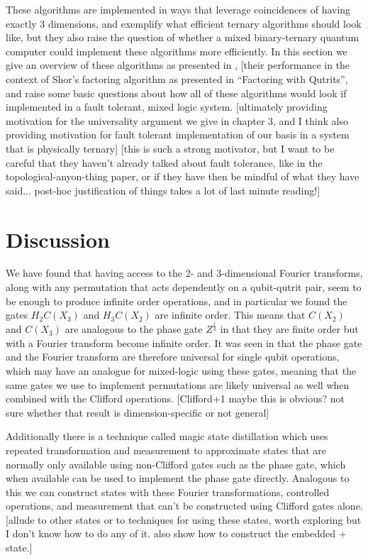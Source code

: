 \documentclass[]{article}
\begin{document}
These algorithms are implemented in ways that leverage coincidences of having exactly 3 dimensions, and exemplify what efficient ternary algorithms should look like, but they also raise the question of whether a mixed binary-ternary quantum computer could implement these algorithms more efficiently. In this section we give an overview of these algorithms as presented in \cite{arithmetics}, [their performance in the context of Shor's factoring algorithm as presented in ``Factoring with Qutrits'', and raise some basic questions about how all of these algorithms would look if implemented in a fault tolerant, mixed logic system. [ultimately providing motivation for the universality argument we give in chapter 3, and I think also providing motivation for fault tolerant implementation of our basis in a system that is physically ternary] [this is such a strong motivator, but I want to be careful that they haven't already talked about fault tolerance, like in the topological-anyon-thing paper, or if they have then be mindful of what they have said... post-hoc justification of things takes a lot of last minute reading!]

\section{Discussion}
We have found that having access to the 2- and 3-dimensional Fourier transforms, along with any permutation that acts dependently on a qubit-qutrit pair, seem to be enough to produce infinite order operations, and in particular we found the gates $H_2 C(X_3)$ and $H_3 C(X_2)$ are infinite order. This means that $C(X_2)$ and $C(X_3)$ are analogous to the phase gate $Z^{\frac{1}{4}}$ in that they are finite order but with a Fourier transform become infinite order. It was seen in \cite{universal-qubit} that the phase gate and the Fourier transform are therefore universal for single qubit operations, which may have an analogue for mixed-logic using these gates, meaning that the same gates we use to implement permutations are likely universal as well when combined with the Clifford operations. [Clifford+1 maybe this is obvious? not sure whether that result is dimension-specific or not general]

Additionally there is a technique called magic state distillation which uses repeated transformation and measurement to approximate states that are normally only available using non-Clifford gates such as the phase gate, which when available can be used to implement the phase gate directly. Analogous to this we can construct states with these Fourier transformations, controlled operations, and measurement that can't be constructed using Clifford gates alone. [allude to other states or to techniques for using these states, worth exploring but I don't know how to do any of it. also show how to construct the embedded + state.]
\end{document}
